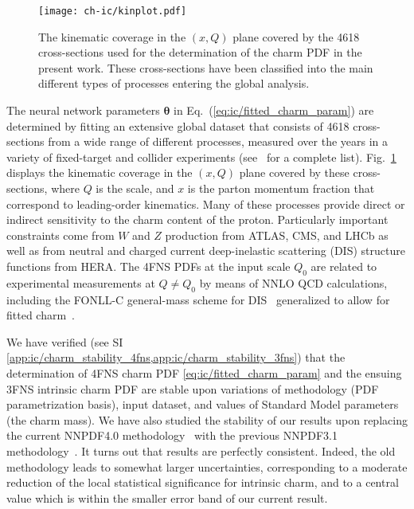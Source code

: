 \begin{figure}[t]
\begin{center}
  \texttt{[image: ch-ic/kinplot.pdf]}
 \end{center}
\vspace{-0.8cm}
\caption{The kinematic coverage in the $(x,Q)$ plane
  covered by the 4618 cross-sections used for the
  determination of the charm PDF in the present work.
  These cross-sections have been classified into the main different
  types of processes entering the global analysis.
  \label{fig:ic/kinplot}
}
\end{figure}

The neural network parameters ${\boldsymbol \theta}$ in
Eq.~(\ref{eq:ic/fitted_charm_param})
are determined by fitting an extensive global dataset that consists of 4618 
cross-sections from a wide range of different processes, measured over
the years in a variety of fixed-target and collider experiments  (see~\cite{Ball:2021leu} for a complete list).
%
Fig.~\ref{fig:ic/kinplot} displays the kinematic coverage in the $(x,Q)$ plane
covered by these cross-sections, where $Q$ is
the  scale, and  $x$ is
the parton momentum fraction that correspond to leading-order kinematics.
%
Many of these processes provide direct or indirect sensitivity 
to the charm content of the proton.
%
Particularly important constraints come from $W$ and $Z$ production from 
ATLAS, CMS, and LHCb as well as from
neutral and charged current deep-inelastic 
scattering (DIS) structure functions from HERA.
%
The 4FNS  PDFs at the input scale $Q_0$ are related
to experimental measurements at $Q \not =Q_0$ by means of NNLO QCD calculations, including
the FONLL-C general-mass scheme for DIS~\cite{Forte:2010ta} generalized to 
allow for fitted charm~\cite{Ball:2015tna}.

We have verified (see SI
\cref{app:ic/charm_stability_4fns,app:ic/charm_stability_3fns}) that the
determination of 4FNS charm PDF \cref{eq:ic/fitted_charm_param} and the ensuing
3FNS intrinsic charm PDF are  stable upon variations of methodology (PDF
parametrization basis), input dataset, and values of Standard Model parameters
(the charm mass).
We have also studied the stability of our results upon replacing the
current NNPDF4.0 methodology~\cite{Ball:2021leu} with the previous
NNPDF3.1 methodology~\cite{NNPDF:2017mvq}. It turns out that results
are  perfectly consistent. Indeed, the old methodology leads to somewhat larger
uncertainties, corresponding to a moderate reduction of the local statistical
significance for intrinsic charm, and to a central value which is
within the smaller  error band of our current result.


